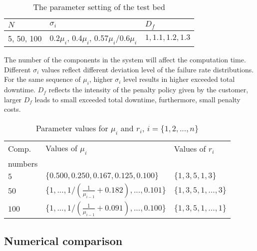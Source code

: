 \documentclass[preprint,12pt]{elsarticle}
\begin{document}
\begin{table}[htbp]
  \centering
  \caption{The parameter setting of the test bed}
    \begin{tabular}{lll}
    \toprule
  $N$ & $\sigma_{i}$ & $D_{f}$\\
    \midrule
    5, 50, 100 & 0.2$\mu_{i}$, 0.4$\mu_{i}$, 0.57$\mu_{i}$/0.6$\mu_{i}$ & $ 1, 1.1, 1.2, 1.3$ \\
  \bottomrule
    \end{tabular}%
  \label{tab:testbedps}%
\end{table}

The number of the components in the system will affect the computation time. Different $\sigma_{i}$ values reflect different deviation level of the failure rate distributions. For the same sequence of $\mu_{i}$, higher $\sigma_{i}$ level results in higher exceeded total downtime. $D_{f}$ reflects the intensity of the penalty policy given by the customer, larger $D_{f}$ leads to small exceeded total downtime, furthermore, small penalty costs.

\begin{table}[htbp]
  \centering
  \caption{Parameter values for $\mu_{i}$ and $r_{i}$, $i=\{1,2,...,n\}$}
    \begin{tabular}{lll}
    \toprule
    Comp. & Values of $\mu_{i}$ & Values of $r_{i}$\\
    numbers & &\\
    \midrule
    $5$   & $\{0.500, 0.250, 0.167, 0.125, 0.100\}$ &$\{1,3,5,1,3\}$\\
    $50$  & $\{1,...,1/(\frac{1}{\mu_{i-1}}+0.182),...,0.101\}$ &$\{1,3,5,1,...,3\}$\\
    $100$ & $\{1,...,1/(\frac{1}{\mu_{i-1}}+0.091),...,0.100\}$ &$\{1,3,5,1,...,1\}$\\
    \bottomrule
    \end{tabular}%
  \label{tab:testbedmur}%
\end{table}



\subsection{Numerical comparison}
\end{document}
